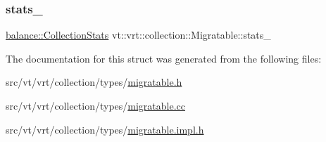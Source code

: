 \mbox{\label{structvt_1_1vrt_1_1collection_1_1_migratable_a7c817ccfcec8fab757528c4d639445e0}} 
\subsubsection{\texorpdfstring{stats\+\_\+}{stats\_}}
{\footnotesize\ttfamily \hyperlink{structvt_1_1vrt_1_1collection_1_1balance_1_1_collection_stats}{balance\+::\+Collection\+Stats} vt\+::vrt\+::collection\+::\+Migratable\+::stats\+\_\+\hspace{0.3cm}{\ttfamily [protected]}}



The documentation for this struct was generated from the following files\+:\begin{DoxyCompactItemize}
\item 
src/vt/vrt/collection/types/\hyperlink{migratable_8h}{migratable.\+h}\item 
src/vt/vrt/collection/types/\hyperlink{migratable_8cc}{migratable.\+cc}\item 
src/vt/vrt/collection/types/\hyperlink{migratable_8impl_8h}{migratable.\+impl.\+h}\end{DoxyCompactItemize}
